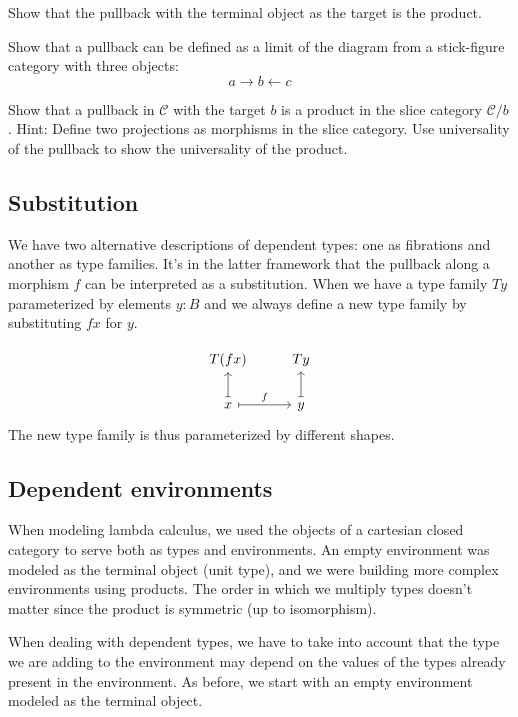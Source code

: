 \documentclass[DaoFP]{subfiles}
\begin{document}
\begin{exercise}
Show that the pullback with the terminal object as the target is the product.
\end{exercise}
\begin{exercise}
Show that a pullback can be defined as a limit of the diagram from a stick-figure category with three objects:
\[ a \rightarrow b \leftarrow c \]
\end{exercise}

\begin{exercise}
Show that a pullback in $\mathcal{C}$ with the target $b$ is a product in the slice category $\mathcal{C}/b$. Hint: Define two projections  as morphisms in the slice category. Use universality of the pullback to show the universality of the product.
\end{exercise}

\subsection{Substitution}

We have two alternative descriptions of dependent types: one as fibrations and another as type families. It's in the latter framework that the pullback along a morphism $f$ can be interpreted as a substitution. When we have a type family $T y$ parameterized by elements $y \colon B$ and we always define a new type family by substituting $f x$ for $y$.

\[
 \begin{tikzcd}
 T (f x)
 & T y
 \\
 x
 \arrow[u, mapsto, ""]
 \arrow[r, mapsto, "f"]
 &y
 \arrow[u, mapsto, ""]
  \end{tikzcd}
\]
The new type family is thus parameterized by different shapes.

\subsection{Dependent environments}
When modeling lambda calculus, we used the objects of a cartesian closed category to serve both as types and environments. An empty environment was modeled as the terminal object (unit type), and we were building more complex environments using products. The order in which we multiply types doesn't matter since the product is symmetric (up to isomorphism).

When dealing with dependent types, we have to take into account that the type we are adding to the environment may depend on the values of the types already present in the environment. As before, we start with an empty environment modeled as the terminal object. 
\end{document}
